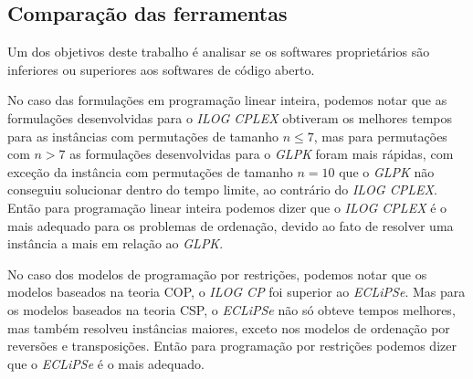 \subsection{Comparação das ferramentas}
\label{subsec:analise_ferramentas}
Um dos objetivos deste trabalho é analisar se os softwares
proprietários são inferiores ou superiores aos softwares de código
aberto.

No caso das formulações em programação linear inteira, podemos notar
que as formulações desenvolvidas para o \textit{ILOG CPLEX} obtiveram
os melhores tempos para as instâncias com permutações de tamanho
$n \le 7$, mas para permutações com $n > 7$ as formulações
desenvolvidas para o \textit{GLPK} foram mais rápidas, com exceção da
instância com permutações de tamanho $n = 10$ que o \textit{GLPK} não
conseguiu solucionar dentro do tempo limite, ao contrário
do \textit{ILOG CPLEX}. Então para programação linear inteira podemos
dizer que o \textit{ILOG CPLEX} é o mais adequado para os problemas de
ordenação, devido ao fato de resolver uma instância a mais em relação
ao \textit{GLPK}.

No caso dos modelos de programação por restrições, podemos notar que
os modelos baseados na teoria COP, o \textit{ILOG CP} foi superior
ao \textit{ECLiPSe}. Mas para os modelos baseados na teoria CSP,
o \textit{ECLiPSe} não só obteve tempos melhores, mas também resolveu
instâncias maiores, exceto nos modelos de ordenação por reversões e
transposições. Então para programação por restrições podemos dizer que
o \textit{ECLiPSe} é o mais adequado.

